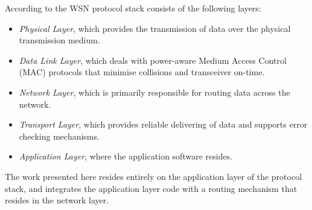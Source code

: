 According to \cite{SensorSurveyAkyildiz:2002} the WSN protocol stack consists
of the following layers:

\begin{itemize}
\item \emph{Physical Layer}, which provides the transmission of data over the physical transmission medium.
\item \emph{Data Link Layer}, which deals with power-aware Medium Access Control (MAC) protocols that minimise collisions and transceiver on-time.
\item \emph{Network Layer}, which is primarily responsible for
routing data across the network.
\item \emph{Transport Layer}, which provides reliable delivering of data and
supports error checking mechanisms.
\item \emph{Application Layer}, where the application software resides.
\end{itemize}

The work presented here resides entirely on the application layer of the
protocol stack, and integrates the application layer code with a routing
mechanism that resides in the network
layer.





